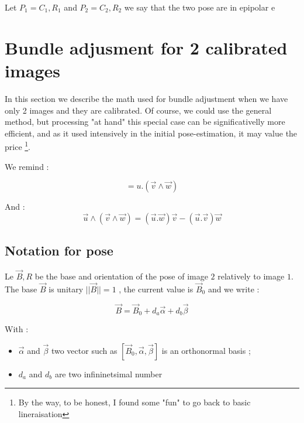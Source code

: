 Let $P_1={C_1,R_1}$ and $P_2={C_2,R_2}$ we say that the two pose are in
epipolar e



\section{Bundle adjusment for 2 calibrated images}

In this section we describe the math used for bundle adjustment
when we have only 2 images and they are calibrated. Of course, we could
use the general method, but  processing "at hand" this special case can
be significativelly more efficient, and as it used intensively in the initial pose-estimation,
it may value the price \footnote{By the way, to be honest, I found some "fun" to go back to
basic lineraisation}.

We remind :

\begin{equation}
    [\vec u,\vec v,\vec w] = u . (\vec v \wedge \vec w)
\end{equation}

And :
\begin{equation}
     \vec u \wedge  (\vec v \wedge \vec w) = (\vec u.\vec w) \vec v - (\vec u.\vec v) \vec w
\end{equation}

\subsection{Notation for pose}

Le $\vec B,R$  be the base and orientation of the pose of image $2$ relatively to image $1$.
The base $\vec B$  is unitary $||\vec B||=1$ , the current value is $\vec B_0$ and
we write :

\begin{equation}
   \vec B = \vec B_0 + d_a \vec \alpha + d_b \vec \beta \label{Eq:BundSimp:LinB}
\end{equation}

With :

\begin{itemize}
   \item  $\vec \alpha$  and $\vec \beta$ two vector such as $ [\vec B_0,  \vec \alpha , \vec \beta]$
         is an orthonormal basis ;

   \item  $d_a$ and $d_b$ are two infininetsimal number
\end{itemize}


